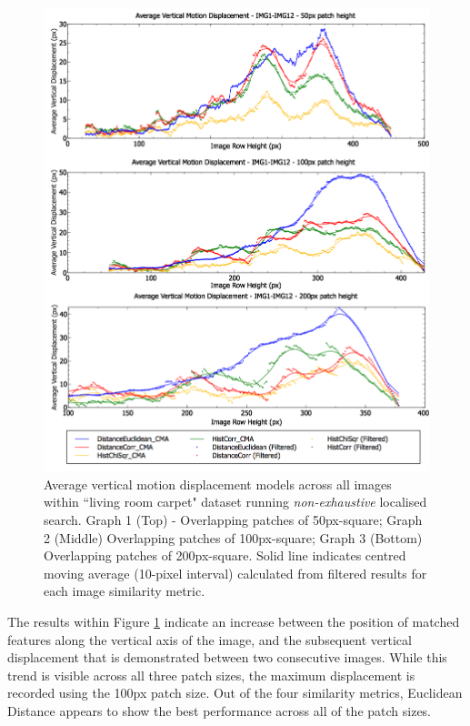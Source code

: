 \begin{figure}[ht!]
\centering
\includegraphics[scale=0.4]{images/results/ex1_results_flat_10cm}
\caption{Average vertical motion displacement models across all images within ``living room carpet" dataset running \textit{non-exhaustive} localised search. Graph 1 (Top) - Overlapping patches of 50px-square; Graph 2 (Middle) Overlapping patches of 100px-square; Graph 3 (Bottom) Overlapping patches of 200px-square. Solid line indicates centred moving average (10-pixel interval) calculated from filtered results for each image similarity metric.}
\label{fig:ex1_1_1}
\end{figure}

The results within Figure \ref{fig:ex1_1_1} indicate an increase between the position of matched features along the vertical axis of the image, and the subsequent vertical displacement that is demonstrated between two consecutive images. While this trend is visible across all three patch sizes, the maximum displacement is recorded using the 100px patch size. Out of the four similarity metrics, Euclidean Distance appears to show the best performance across all of the  patch sizes.

